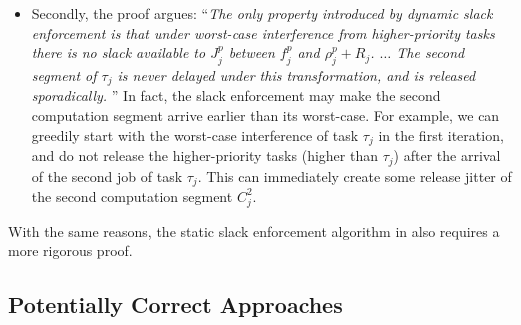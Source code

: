 \begin{itemize}
\begin{itemize}
  \item Secondly, the proof argues: ``\emph{The only property
      introduced by dynamic slack enforcement is that under worst-case
      interference from higher-priority tasks there is no slack
      available to $J_j^p$ between $f_j^p$ and $\rho_j^p + R_j$.
      $\ldots$ The second segment of $\tau_j$ is never delayed under
      this transformation, and is released sporadically.} '' In fact,
    the slack enforcement may make the second computation segment
    arrive earlier than its worst-case. For example, we can greedily
    start with the worst-case interference of task $\tau_j$ in the
    first iteration, and do not release the higher-priority tasks
    (higher than $\tau_j$) after the arrival of the second job of task
    $\tau_j$. This can immediately create some release jitter of the
    second computation segment $C_j^2$.
  \end{itemize}
  With the same reasons, the static slack enforcement algorithm in
  \cite{LR:rtas10} also requires a more rigorous proof.
\end{itemize}

\subsection{Potentially Correct Approaches}
\label{sec:correct-solutions} 

